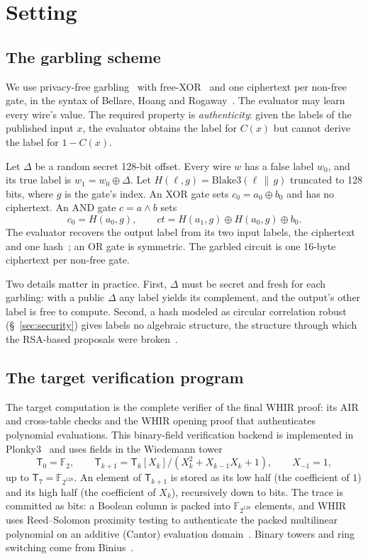 \documentclass[11pt]{article}
\newcommand{\F}{\mathbb{F}_{2^{128}}}
\newcommand{\T}{\mathsf{T}}
\newcommand{\AND}{\textsf{AND}}
\newcommand{\XOR}{\textsf{XOR}}
\newcommand{\blake}{\mathrm{Blake3}}
\begin{document}
\section{Setting}\label{sec:setting}

\subsection{The garbling scheme}\label{sec:garbling}

We use privacy-free garbling~\cite{fno15privacyfree} with free-XOR~\cite{ks08}
and one ciphertext per non-free gate, in the syntax of Bellare, Hoang and
Rogaway~\cite{bhr12foundations}. The evaluator may learn every wire's value.
The required property is \emph{authenticity}: given the labels of the
published input $x$, the evaluator obtains the label for $C(x)$ but cannot
derive the label for $1-C(x)$.

Let $\Delta$ be a random
secret 128-bit offset. Every wire $w$ has a false label $w_0$, and its true label
is $w_1=w_0\oplus\Delta$. Let $H(\ell,g)=\blake(\ell\,\|\,g)$ truncated to 128
bits, where $g$ is the gate's index. An \XOR{} gate sets $c_0=a_0\oplus b_0$ and
has no ciphertext. An \AND{} gate $c=a\wedge b$ sets
\[
  c_0 = H(a_0,g), \qquad \mathit{ct} = H(a_1,g)\oplus H(a_0,g)\oplus b_0 .
\]
The evaluator recovers the output label from its two input labels, the
ciphertext and one hash~\cite[\S6]{zre15}; an \textsf{OR} gate is symmetric. The
garbled circuit is one 16-byte ciphertext per non-free gate.

Two details matter in practice. First, $\Delta$ must be secret and fresh for
each garbling: with a public $\Delta$ any label yields its complement, and the
output's other label is free to compute. Second, a hash modeled as circular
correlation robust~\cite{ckkz12freexor} (\S~\ref{sec:security}) gives labels
no algebraic structure, the structure through which the RSA-based proposals
were broken~\cite{flb25}.

\subsection{The target verification program}

The target computation is the complete verifier of the final WHIR proof: its
AIR and cross-table checks and the WHIR opening proof that authenticates
polynomial evaluations. This binary-field verification backend is implemented in Plonky3~\cite{plonky3} and uses fields in the
Wiedemann tower~\cite{wiedemann88}
\[
  \T_0=\mathbb{F}_2,\qquad \T_{k+1}=\T_k[X_k]/(X_k^2+X_{k-1}X_k+1),\qquad X_{-1}=1 ,
\]
up to $\T_7=\F$. An element of $\T_{k+1}$ is stored as its low half (the
coefficient of $1$) and its high half (the coefficient of $X_k$), recursively
down to bits. The trace is committed as bits: a Boolean column is packed into
$\F$ elements, and WHIR uses Reed--Solomon proximity testing to authenticate the packed
multilinear polynomial on an additive (Cantor) evaluation
domain~\cite{whir25,cantor89,lch14}. Binary towers and
ring switching come from Binius~\cite{dp25binius,dp24ringswitch}.
\end{document}
